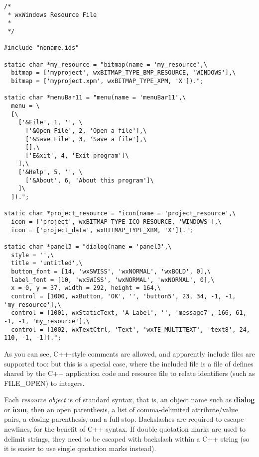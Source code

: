 \begin{verbatim}
/*
 * wxWindows Resource File
 *
 */

#include "noname.ids"

static char *my_resource = "bitmap(name = 'my_resource',\
  bitmap = ['myproject', wxBITMAP_TYPE_BMP_RESOURCE, 'WINDOWS'],\
  bitmap = ['myproject.xpm', wxBITMAP_TYPE_XPM, 'X']).";

static char *menuBar11 = "menu(name = 'menuBar11',\
  menu = \
  [\
    ['&File', 1, '', \
      ['&Open File', 2, 'Open a file'],\
      ['&Save File', 3, 'Save a file'],\
      [],\
      ['E&xit', 4, 'Exit program']\
    ],\
    ['&Help', 5, '', \
      ['&About', 6, 'About this program']\
    ]\
  ]).";

static char *project_resource = "icon(name = 'project_resource',\
  icon = ['project', wxBITMAP_TYPE_ICO_RESOURCE, 'WINDOWS'],\
  icon = ['project_data', wxBITMAP_TYPE_XBM, 'X']).";

static char *panel3 = "dialog(name = 'panel3',\
  style = '',\
  title = 'untitled',\
  button_font = [14, 'wxSWISS', 'wxNORMAL', 'wxBOLD', 0],\
  label_font = [10, 'wxSWISS', 'wxNORMAL', 'wxNORMAL', 0],\
  x = 0, y = 37, width = 292, height = 164,\
  control = [1000, wxButton, 'OK', '', 'button5', 23, 34, -1, -1, 'my_resource'],\
  control = [1001, wxStaticText, 'A Label', '', 'message7', 166, 61, -1, -1, 'my_resource'],\
  control = [1002, wxTextCtrl, 'Text', 'wxTE_MULTITEXT', 'text8', 24, 110, -1, -1]).";
\end{verbatim}

As you can see, C++-style comments are allowed, and apparently include files
are supported too: but this is a special case, where the included file
is a file of defines shared by the C++ application code and resource file
to relate identifiers (such as FILE\_OPEN) to integers.

Each {\it resource object} is of standard  syntax, that is,
an object name such as {\bf dialog} or {\bf icon}, then an open
parenthesis, a list of comma-delimited attribute/value pairs, a closing
parenthesis, and a full stop. Backslashes are required to escape newlines,
for the benefit of C++ syntax. If double quotation marks are used to
delimit strings, they need to be escaped with backslash within a C++ string
(so it is easier to use single quotation marks instead).


